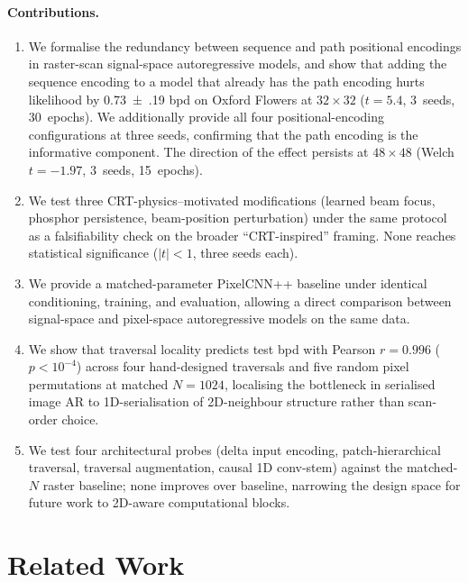 \documentclass[conference]{IEEEtran}
\begin{document}
\paragraph{Contributions.}
\begin{enumerate}
  \item We formalise the redundancy between sequence and path
    positional encodings in raster-scan signal-space autoregressive
    models, and show that adding the sequence encoding to a model
    that already has the path encoding hurts likelihood by
    \SI{0.73(19)}{} bpd
    on Oxford Flowers at $32\times32$ ($t=5.4$, 3~seeds, 30~epochs).
    We additionally provide all four positional-encoding
    configurations at three seeds, confirming that the path encoding
    is the informative component. The direction of the effect
    persists at $48\times48$ (Welch $t=-1.97$, 3~seeds, 15~epochs).
  \item We test three CRT-physics--motivated modifications
    (learned beam focus, phosphor persistence, beam-position
    perturbation) under the same protocol as a falsifiability check
    on the broader ``CRT-inspired'' framing. None reaches statistical
    significance ($|t|<1$, three seeds each).
  \item We provide a matched-parameter PixelCNN++ baseline under
    identical conditioning, training, and evaluation, allowing a
    direct comparison between signal-space and pixel-space
    autoregressive models on the same data.
  \item We show that traversal locality predicts test bpd with
    Pearson $r=0.996$ ($p<10^{-4}$) across four hand-designed
    traversals and five random pixel permutations at matched
    $N{=}1024$, localising the bottleneck in serialised image AR
    to 1D-serialisation of 2D-neighbour structure rather than
    scan-order choice.
  \item We test four architectural probes (delta input encoding,
    patch-hierarchical traversal, traversal augmentation, causal
    1D conv-stem) against the matched-$N$ raster baseline; none
    improves over baseline, narrowing the design space for future
    work to 2D-aware computational blocks.
\end{enumerate}

\section{Related Work}\label{sec:related}
\end{document}
